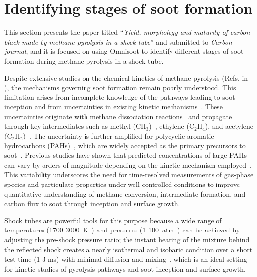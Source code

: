 \section{Identifying stages of soot formation}
\label{sec:paper3_stages_soot_formations}

This section presents the paper titled ``\textit{Yield, morphology and maturity of carbon black made by methane pyrolysis in a shock tube}'' and submitted to \textit{Carbon journal}, and it is focused on using Omnisoot to identify different stages of soot formation during methane pyrolysis in a shock-tube.

Despite extensive studies on the chemical kinetics of methane pyrolysis (Refs. in \cite{fau2013methane}), the mechanisms governing soot formation remain poorly understood. This limitation arises from incomplete knowledge of the pathways leading to soot inception and from uncertainties in existing kinetic mechanisms~\citep{agafonov2016unified}. These uncertainties originate with methane dissociation reactions~\citep{vlasov2022experimental} and propagate through key intermediates such as methyl ($\mathrm{CH_3}$)~\citep{wang2016improved}, ethylene ($\mathrm{C_2H_4}$), and acetylene ($\mathrm{C_2H_2}$)~\citep{sajid2016shock}. The uncertainty is further amplified for polycyclic aromatic hydrocarbons (PAHs)~\citep{nativel2019shock}, which are widely accepted as the primary precursors to soot~\cite{alfe2009structure}. Previous studies have shown that predicted concentrations of large PAHs can vary by orders of magnitude depending on the kinetic mechanism employed~\citep{wang2023systematic}. This variability underscores the need for time-resolved measurements of gas-phase species and particulate properties under well-controlled conditions to improve quantitative understanding of methane conversion, intermediate formation, and carbon flux to soot through inception and surface growth.

Shock tubes are powerful tools for this purpose because a wide range of temperatures (1700-3000~K~\citep{agafonov2016unified}) and pressures (1-100~atm~\citep{shao2020shock}) can be achieved by adjusting the pre-shock pressure ratio; the instant heating of the mixture behind the reflected shock creates a nearly isothermal and isobaric condition over a short test time (1-3 ms) with minimal diffusion and mixing~\citep{eremin2012formation}, which is an ideal setting for kinetic studies of pyrolysis pathways and soot inception and surface growth.

